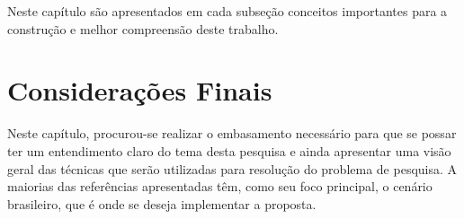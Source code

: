 Neste capítulo são apresentados em cada subseção conceitos importantes para a construção e melhor compreensão deste trabalho.





\section{Considerações Finais}

Neste capítulo, procurou-se realizar o embasamento necessário para que se possar ter um entendimento claro do tema desta pesquisa e ainda apresentar uma visão geral das técnicas que serão utilizadas para resolução do problema de pesquisa. A maiorias das referências apresentadas têm, como seu foco principal, o cenário brasileiro, que é onde se deseja implementar a proposta.
